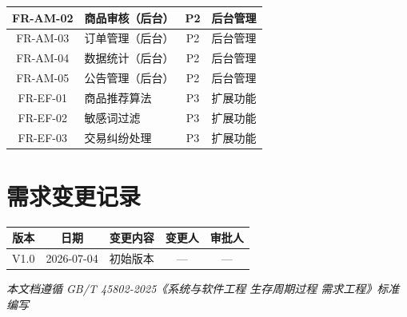 \documentclass[12pt,a4paper,UTF8]{ctexart}
\begin{document}
\begin{longtable}{|c|p{}|c|p{}|}
    \hline
    FR-AM-02 & 商品审核（后台） & P2 & 后台管理 \\
    \hline
    FR-AM-03 & 订单管理（后台） & P2 & 后台管理 \\
    \hline
    FR-AM-04 & 数据统计（后台） & P2 & 后台管理 \\
    \hline
    FR-AM-05 & 公告管理（后台） & P2 & 后台管理 \\
    \hline
    FR-EF-01 & 商品推荐算法 & P3 & 扩展功能 \\
    \hline
    FR-EF-02 & 敏感词过滤 & P3 & 扩展功能 \\
    \hline
    FR-EF-03 & 交易纠纷处理 & P3 & 扩展功能 \\
    \hline
\end{longtable}

\section{需求变更记录}

\begin{longtable}{|c|c|p{}|c|c|}
    \hline
    \textbf{版本} & \textbf{日期} & \textbf{变更内容} & \textbf{变更人} & \textbf{审批人} \\
    \hline
    V1.0 & 2026-07-04 & 初始版本 & --- & --- \\
    \hline
\end{longtable}

\vfill
\begin{center}
    \textit{本文档遵循 GB/T 45802-2025《系统与软件工程 生存周期过程 需求工程》标准编写}
\end{center}
\end{document}
